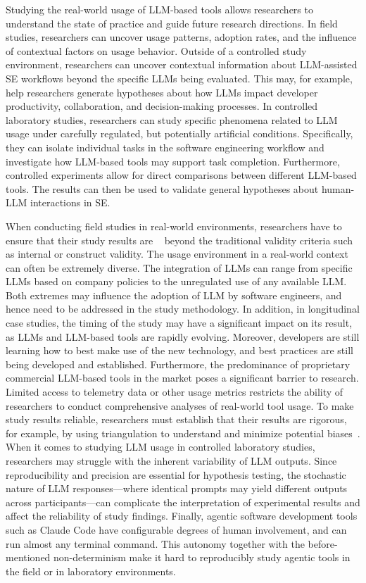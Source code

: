 
Studying the real-world usage of LLM-based tools allows researchers to understand the state of practice and guide future research directions.
In field studies, researchers can uncover usage patterns, adoption rates, and the influence of contextual factors on usage behavior.
Outside of a controlled study environment, researchers can uncover contextual information about LLM-assisted SE workflows beyond the specific LLMs being evaluated.
This may, for example, help researchers generate hypotheses about how LLMs impact developer productivity, collaboration, and decision-making processes.
In controlled laboratory studies, researchers can study specific phenomena related to LLM usage under carefully regulated, but potentially artificial conditions.
Specifically, they can isolate individual tasks in the software engineering workflow and investigate how LLM-based tools may support task completion.
Furthermore, controlled experiments allow for direct comparisons between different LLM-based tools.
The results can then be used to validate general hypotheses about human-LLM interactions in SE.


When conducting field studies in real-world environments, researchers have to ensure that their study results are ~\cite{Sullivan2011-ub} beyond the traditional validity criteria such as internal or construct validity.
The usage environment in a real-world context can often be extremely diverse.
The integration of LLMs can range from specific LLMs based on company policies to the unregulated use of any available LLM. 
Both extremes may influence the adoption of LLM by software engineers, and hence need to be addressed in the study methodology.
In addition, in longitudinal case studies, the timing of the study may have a significant impact on its result, as LLMs and LLM-based tools are rapidly evolving.
Moreover, developers are still learning how to best make use of the new technology, and best practices are still being developed and established.
Furthermore, the predominance of proprietary commercial LLM-based tools in the market poses a significant barrier to research.
Limited access to telemetry data or other usage metrics restricts the ability of researchers to conduct comprehensive analyses of real-world tool usage.
To make study results reliable, researchers must establish that their results are rigorous, for example, by using triangulation to understand and minimize potential biases~\cite{Sullivan2011-ub}.
When it comes to studying LLM usage in controlled laboratory studies, researchers may struggle with the inherent variability of LLM outputs.
Since reproducibility and precision are essential for hypothesis testing, the stochastic nature of LLM responses---where identical prompts may yield different outputs across participants---can complicate the interpretation of experimental results and affect the reliability of study findings.
Finally, agentic software development tools such as Claude Code have configurable degrees of human involvement, and can run almost any terminal command.
This autonomy together with the before-mentioned non-determinism make it hard to reproducibly study agentic tools in the field or in laboratory environments.
